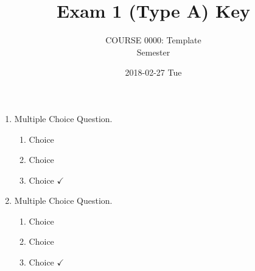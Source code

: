 \documentclass[article,letterpaper,times,10pt,listings-bw,microtype]{article}
\author{COURSE 0000: Template \\ Semester}
\date{2018-02-27 Tue}
\title{Exam 1 (Type A) Key}
\begin{document}
\maketitle
\begin{enumerate}
\item Multiple Choice Question.
\begin{enumerate}
\item Choice
\item Choice
\item Choice \(\checkmark\)
\end{enumerate}

\item Multiple Choice Question.
\begin{enumerate}
\item Choice
\item Choice
\item Choice \(\checkmark\)
\end{enumerate}
\end{enumerate}
\end{document}
